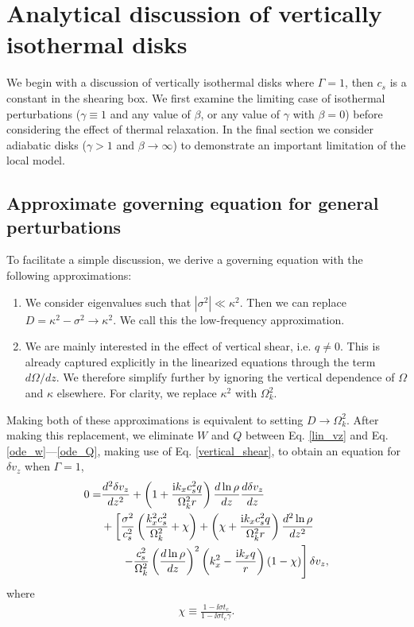 \section{Analytical discussion of vertically isothermal disks}\label{analytical}
We begin with a discussion of vertically isothermal disks
where $\Gamma=1$, then $c_s$ is a constant in the shearing box. We
first examine the limiting case of isothermal perturbations
($\gamma\equiv1$ and any value of $\beta$, or any value of $\gamma$ with
$\beta = 0$) before considering the effect of thermal relaxation. In the
final section we consider adiabatic disks ($\gamma>1$ and
$\beta\to\infty$) to demonstrate an important limitation of the 
local model. 

\subsection{Approximate governing equation for general perturbations}\label{approx_gov}
To facilitate a simple discussion, we derive a governing
equation with the following approximations: 

\begin{enumerate}
\item We consider eigenvalues such that
  $|\sigma^2|\ll \kappa^2$. Then we can replace $D=\kappa^2 -\sigma^2\to
  \kappa^2$. %
  We call this the
  low-frequency approximation. 
\item We are mainly interested in the effect of vertical shear, i.e. $q\neq
  0$. This is already captured explicitly in the linearized equations through
  the term $d\Omega/dz$. We therefore simplify
  further by ignoring the vertical dependence of $\Omega$ and $\kappa$
  elsewhere. For clarity, we replace $\kappa^2$ with $\Omega_k^2$. 
 
\end{enumerate}
Making both of these approximations is equivalent to setting 
$D\to\Omega_k^2$.  After making this replacement, we eliminate $W$ and
$Q$ between  Eq. \ref{lin_vz} and Eq. \ref{ode_w}---\ref{ode_Q},
making use of Eq. \ref{vertical_shear}, to
obtain an equation for $\delta v_z$ when $\Gamma=1$,
\begin{align}
  0 =& \frac{d^2\delta v_z}{dz^2} + \left(1 + \frac{\mathrm{i} k_x c_s^2
      q}{\Omega_k^2r}\right)\frac{d\ln\rho}{dz}\frac{d\delta
    v_z}{dz} \notag\\
  &+ \left[\frac{\sigma^2}{c_s^2}\left(\frac{k_x^2c_s^2}{\Omega_k^2} +
      \chi\right) + \left(\chi + \frac{\mathrm{i} k_x c_s^2
        q}{\Omega_k^2r}\right)\frac{d^2\ln\rho}{dz^2}\right. \notag\\
    &\phantom{+=}\left.-
    \frac{c_s^2}{\Omega_k^2}\left(\frac{d\ln\rho}{dz}\right)^2\left(k_x^2 -
      \frac{\mathrm{i} k_x q}{r}\right)
   \left(1-\chi\right) 
   \right]\delta v_z,\label{vertiso_gov}
\end{align}
where
\begin{align}
  \chi \equiv \frac{1-\ii\sigma t_c}{1-\ii\sigma t_c\gamma}.
\end{align}

